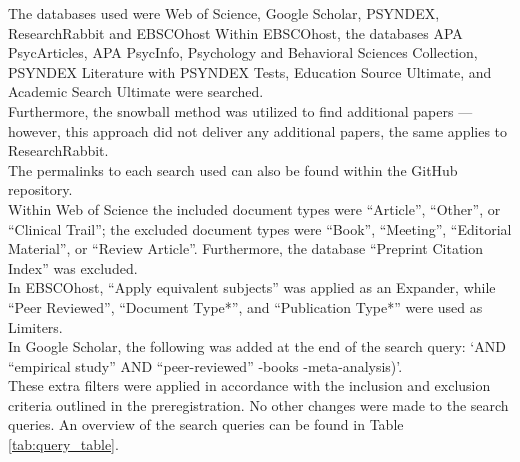 \documentclass[
  stu, a4paper,floatsintext]{apa7}
\begin{document}
The databases used were Web of Science, Google Scholar, PSYNDEX, ResearchRabbit and EBSCOhost Within EBSCOhost, the databases APA PsycArticles, APA PsycInfo, Psychology and Behavioral Sciences Collection, PSYNDEX Literature with PSYNDEX Tests, Education Source Ultimate, and Academic Search Ultimate were searched.\\
Furthermore, the snowball method was utilized to find additional papers --- however, this approach did not deliver any additional papers, the same applies to ResearchRabbit.\\
The permalinks to each search used can also be found within the GitHub repository.\\
Within Web of Science the included document types were ``Article'', ``Other'', or ``Clinical Trail''; the excluded document types were ``Book'', ``Meeting'', ``Editorial Material'', or ``Review Article''.
Furthermore, the database ``Preprint Citation Index'' was excluded.\\
In EBSCOhost, ``Apply equivalent subjects'' was applied as an Expander, while ``Peer Reviewed'', ``Document Type*'', and ``Publication Type*'' were used as Limiters.\\
In Google Scholar, the following was added at the end of the search query: `AND ``empirical study'' AND ``peer-reviewed'' -books -meta-analysis)'.\\
These extra filters were applied in accordance with the inclusion and exclusion criteria outlined in the preregistration. No other changes were made to the search queries. An overview of the search queries can be found in Table \ref{tab:query_table}.
\end{document}
